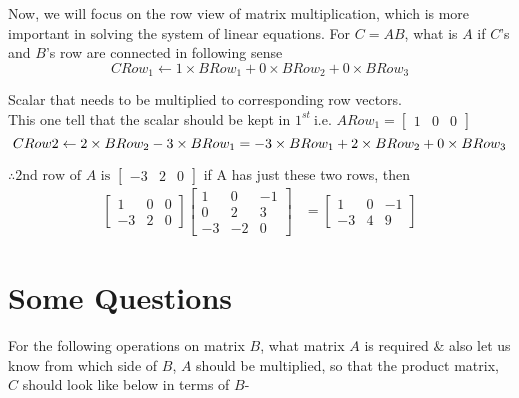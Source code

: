 \documentclass{article}
\begin{document}
Now, we will focus on the row view of matrix multiplication, which is more important in solving the system of linear equations. For $C = AB$, what is $A$ if $C$'s and $B$'s row are connected in following sense\\
\[
    CRow_1 \leftarrow 1\times BRow_1 + 0\times BRow_2 + 0\times BRow_3
\]

Scalar that needs to be multiplied to corresponding row vectors.\\
This one tell that the scalar should be kept in \begin{math}1^{st}~ \text{i.e. }ARow_1 = \begin{bmatrix}1 & 0 & 0\end{bmatrix}\end{math}
\[
    CRow2 \leftarrow 2\times BRow_2 - 3\times BRow_1 \\
     = -3\times BRow_1 + 2\times BRow_2 + 0\times BRow_3
\]

\begin{math}
    \therefore \text{2nd row of }A\text{ is } \begin{bmatrix}-3 & 2 & 0\end{bmatrix}
\end{math}
if A has just these two rows, then 
\begin{align}
    \begin{bmatrix}
        1 & 0 & 0\\
        -3 & 2 & 0
    \end{bmatrix}\begin{bmatrix}
                    1 & 0 & -1\\
                    0 & 2 & 3\\
                    -3 & -2 & 0
                 \end{bmatrix} &= \begin{bmatrix}
                                    1 & 0 & -1\\
                                    -3 & 4 & 9
                                  \end{bmatrix}\nonumber
\end{align}

\section{Some Questions}
For the following operations on matrix $B$, what matrix $A$ is required \& also let us know from which side of $B$, $A$ should be multiplied, so that the product matrix, $C$ should look like below in terms of $B$-\\
\end{document}
